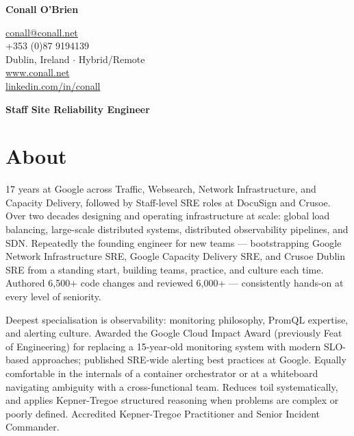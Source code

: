 \documentclass[a4paper, 10pt] {article}
\begin{document}
\begingroup
  \centering
  \LARGE \textbf{Conall O'Brien}\\[1.5em]
\endgroup


\begingroup
  \centering
  \small
      \href{mailto:conall@conall.net}{conall@conall.net} \\
      +353 (0)87 9194139 \\
      Dublin, Ireland $\cdot$ Hybrid/Remote \\
      \href{https://www.conall.net}{www.conall.net} \\
      \href{https://www.linkedin.com/in/conall}{linkedin.com/in/conall} \\
      \vspace{5mm} %
  \normalsize
\endgroup

\begingroup
  \centering
  \large \textbf{Staff Site Reliability Engineer}\\[1em]
\endgroup

\section*{About}

17 years at Google across Traffic, Websearch, Network Infrastructure, and
Capacity Delivery, followed by Staff-level SRE roles at DocuSign and Crusoe.
Over two decades designing and operating infrastructure at scale: global load
balancing, large-scale distributed systems, distributed observability pipelines,
and SDN. Repeatedly the founding engineer for new teams --- bootstrapping
Google Network Infrastructure SRE, Google Capacity Delivery SRE, and Crusoe
Dublin SRE from a standing start, building teams, practice, and culture each
time. Authored 6,500+ code changes and reviewed 6,000+ --- consistently
hands-on at every level of seniority.

Deepest specialisation is observability: monitoring philosophy, PromQL
expertise, and alerting culture. Awarded the Google Cloud Impact Award
(previously Feat of Engineering) for replacing a 15-year-old monitoring system
with modern SLO-based approaches; published SRE-wide alerting best practices
at Google. Equally comfortable in the internals of a container orchestrator or
at a whiteboard navigating ambiguity with a cross-functional team. Reduces toil
systematically, and applies Kepner-Tregoe structured reasoning when problems
are complex or poorly defined. Accredited Kepner-Tregoe Practitioner and Senior
Incident Commander.
\end{document}
